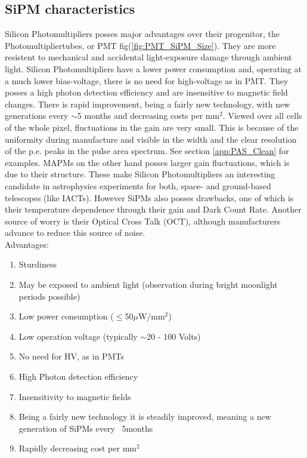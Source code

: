 \documentclass[12pt,article,type=msc,colorback,accentcolor=tud9c]{tudthesis}
\begin{document}
\subsection{SiPM characteristics}
\begin{figure}[t]
\begin{centering}
}
\caption[Structure and carrier multiplication through an avalanche inside a SiPM]{Structure and carrier multiplication through an avalanche inside a SiPM. Picture from \cite{HPK_SiPM}}
\label{fig:SiPM_scheme}
\end{centering}
\end{figure}
Silicon Photomultipliers posses major advantages over their progenitor, the Photomultipliertubes, or PMT fig(\ref{fig:PMT_SiPM_Size}). They are more resistent to mechanical and accidental light-exposure damage through ambient light. Silicon Photomultipliers have a lower power consumption and, operating at a much lower bias-voltage, there is no need for high-voltage as in PMT. They posses a high photon detection efficiency and are insensitive to magnetic field changes. There is rapid improvement, being a fairly new technology, with new generations every $\sim$5 months and decreasing costs per mm$^2$. Viewed over all cells of the whole pixel, fluctuations in the gain are very small. This is because of the uniformity during manufacture and visible in the width and the clear resolution of the p.e. peaks in the pulse area spectrum. See section {\ref{app:PAS_Clean}} for examples. MAPMs on the other hand posses larger gain fluctuations, which is due to their structure. These make Silicon Photomultipliers an interesting candidate in astrophysics experiments for both, space- and ground-based telescopes (like IACTs). However SiPMs also posses drawbacks, one of which is their temperature dependence through their gain and Dark Count Rate. Another source of worry is their Optical Cross Talk (OCT), although manufacturers advance to reduce this source of noise.\\
Advantages:
\begin{multicols}{2}
\begin{enumerate}[topsep=0pt,itemsep=-1ex,partopsep=1ex,parsep=1ex]
\item Sturdiness
\item May be exposed to ambient light (observation during bright moonlight periods possible)
\item Low power consumption ($\leq$50$\mu$W/mm$^2$)
\item Low operation voltage (typically $\sim$20 - 100 Volts)
\item No need for HV, as in PMTs
\item High Photon detection efficiency
\item Insensitivity to magnetic fields
\item Being a fairly new technology it is steadily improved, meaning a new generation of SiPMs every ~5months
\item Rapidly decreasing cost per mm$^2$
\end{enumerate}
\end{multicols}
\end{document}
